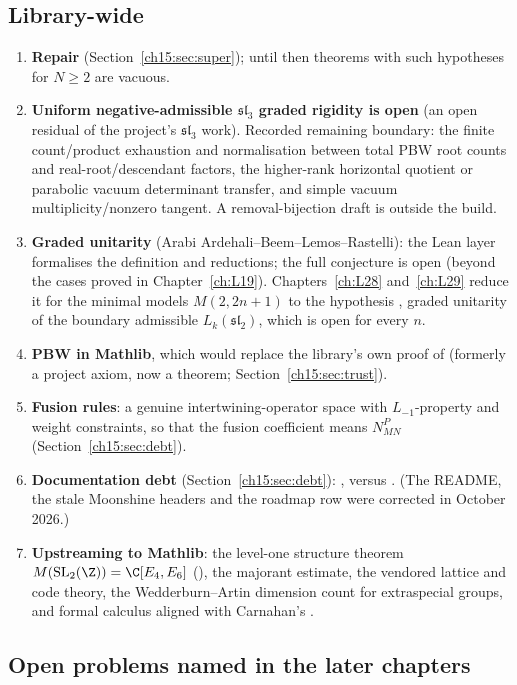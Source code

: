 \subsection{Library-wide}
\begin{enumerate}
\item \textbf{Repair } (Section~\ref{ch15:sec:super}); until then
  theorems with such hypotheses for $N\ge2$ are vacuous.
\item \textbf{Uniform negative-admissible $\mathfrak{sl}_3$ graded rigidity is open} (an open residual of the project's
  $\mathfrak{sl}_3$ work). Recorded remaining boundary: the finite count/product
  exhaustion and normalisation between total PBW root counts and real-root/descendant factors, the
  higher-rank horizontal quotient or parabolic vacuum determinant transfer, and simple vacuum
  multiplicity/nonzero tangent. A removal-bijection draft is outside the build.
\item \textbf{Graded unitarity} (Arabi Ardehali--Beem--Lemos--Rastelli): the Lean layer formalises the definition and
  reductions; the full conjecture is open (beyond the cases proved in Chapter~\ref{ch:L19}). Chapters~\ref{ch:L28}
  and~\ref{ch:L29} reduce it for the minimal models $M(2,2n+1)$ to the hypothesis , graded unitarity of the
  boundary admissible $L_k(\mathfrak{sl}_2)$, which is open for every $n$.
\item \textbf{PBW in Mathlib}, which would replace the library's own proof of  (formerly a project axiom, now a theorem; Section~\ref{ch15:sec:trust}).
\item \textbf{Fusion rules}: a genuine intertwining-operator space with $L_{-1}$-property and weight
  constraints, so that the fusion coefficient means $N^P_{MN}$ (Section~\ref{ch15:sec:debt}).
\item \textbf{Documentation debt} (Section~\ref{ch15:sec:debt}): ,  versus
  . (The README, the stale Moonshine headers and the roadmap row were corrected in October 2026.)
\item \textbf{Upstreaming to Mathlib}: the level-one structure theorem $M(\mathrm{SL}_2(\Z))=\C[E_4,E_6]$
  (), the majorant estimate, the vendored lattice and code theory,
  the Wedderburn--Artin dimension count for extraspecial groups, and formal calculus aligned with
  Carnahan's .
\end{enumerate}

\subsection{Open problems named in the later chapters}\label{ch15:sec:open-later}

